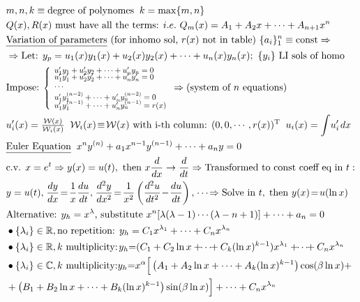     \vspace{-5pt}
\begin{align*}
    &m, n, k \equiv \text{degree of polynomes} \; \;  k = \max\{m,n\}\\
   &Q(x), R(x) \text{ must have all the terms: } i.e. \ Q_m(x)= A_1 +A_2x+ \cdots+ A_{n+1}x^n\\
   &\underline{\text{Variation of parameters}} \ \text{(for inhomo sol, $r(x)$ not in table)} \ \{a_i\}_1^n\equiv \text{const} \Rightarrow \\
    &\Rightarrow \text{Let: } y_p = u_1(x)y_1(x) + u_2(x)y_2(x) + \cdots + u_n(x)y_n(x); \ \{y_i\} \text{ LI sols of homo}\\
    &\text{Impose: } 
  \scalebox{0.8}{$
\left\{
\begin{array}{l}
u_1'y_1 + u_2'y_2 + \cdots + u_n'y_n = 0 \\[-0.8ex]
u_1'y_1' + u_2'y_2' + \cdots + u_n'y_n' = 0 \\
\cdots \\
u_1'y_1^{(n-2)} + \cdots + u_n'y_n^{(n-2)} = 0 \\[-0.8ex]
u_1'y_1^{(n-1)} + \cdots + u_n'y_n^{(n-1)} = r(x)
\end{array}
\right.
$}
 \Rightarrow \text{(system of $n$ equations)}\\
    &u_i'(x) = \tfrac{\mathcal{W}(x)}{\mathcal{W}_i (x)} \;\;  \mathcal{W}_i (x) \!\equiv \! \mathcal{W}(x) \text{ with i-th column: } (0,0, \cdots, r(x))^{\text{T}} \; \; u_i(x)= \int \!u_i' \;\! dx\\
     &\underline{\text{Euler Equation}} \;\; x^n y^{(n)} + a_1 x^{n-1} y^{(n-1)} + \cdots + a_n y = 0\\
    &\text{c.v. } x = e^t \Rightarrow y(x) = u(t), \text{ then } x \frac{d}{dx} \to \frac{d}{dt} \Rightarrow \text{Transformed to const coeff eq in } t:\\
    &y = u(t), \;\! \frac{dy}{dx} \!=\! \frac{1}{x}\frac{du}{dt}, \;\! \frac{d^2y}{dx^2} \!=\! \frac{1}{x^2}\left(\frac{d^2u}{dt^2} \!-\! \frac{du}{dt} \right), \;\!\cdots \!\Rightarrow \text{Solve in } t,\; \text{then } y(x) \!=\! u(\ln x)\\ 
    &\text{Alternative: } y_h = x^\lambda\text{, substitute } x^n[\lambda(\lambda-1)\cdots(\lambda-n+1)] + \cdots + a_n = 0\\
&\bullet \{\lambda_i\} \in \mathbb{R}, \text{no repetition: }y_h = C_1x^{\lambda_1} + \cdots + C_nx^{\lambda_n}\\
&\bullet  \{\lambda_i\} \in \mathbb{R}, k\text{ multiplicity:}\;\! y_h {=} (C_1 + C_2\ln x + \!\!\cdots\!\! + C_k(\ln x)^{k-1})x^{\lambda_1} +\!\!\cdots\!\! + C_nx^{\lambda_n}\\
&\bullet  \{\lambda_i\} \in \mathbb{C}, k\text{ multiplicity:} y_h {=} 
x^{\alpha} \Big[\left(A_1 + A_2 \ln x + \cdots + A_{k}(\ln x)^{k-1}\right)\cos(\beta \ln x) +\\
& + \left(B_1 + B_2 \ln x + \cdots + B_{k}(\ln x)^{k-1}\right)\sin(\beta \ln x)\Big] + \cdots + C_nx^{\lambda_n}
\end{align*}
